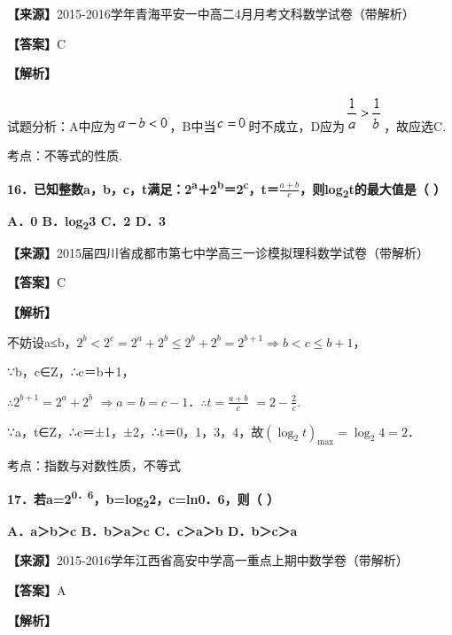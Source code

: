 \documentclass[
]{article}
\begin{document}
\textbf{【来源】}2015-2016学年青海平安一中高二4月月考文科数学试卷（带解析）

\textbf{【答案】}C

\textbf{【解析】}

试题分析：A中应为\includegraphics[width=0.63551in,height=0.19794in]{Fig//media/image165.png}，B中当\includegraphics[width=0.38547in,height=0.19794in]{Fig//media/image166.png}时不成立，D应为\includegraphics[width=0.4584in,height=0.42714in]{Fig//media/image167.png}，故应选C.

考点：不等式的性质.

\textbf{16．已知整数a，b，c，t满足：2\textsuperscript{a}＋2\textsuperscript{b}＝2\textsuperscript{c}，t＝}\(\frac{a + b}{c}\)\textbf{，则log\textsubscript{2}t的最大值是（
）}

\textbf{A．0 B．log\textsubscript{2}3 C．2 D．3}

\textbf{【来源】}2015届四川省成都市第七中学高三一诊模拟理科数学试卷（带解析）

\textbf{【答案】}C

\textbf{【解析】}

不妨设a≤b，\(2^{b} < 2^{c} = 2^{a} + 2^{b} \leq 2^{b} + 2^{b} = 2^{b + 1} \Rightarrow b < c \leq b + 1\)，

∵b，c∈Z，∴c＝b＋1，

\(\therefore 2^{b + 1} = 2^{a} + 2^{b}\)
\(\Rightarrow a = b = c - 1\)．\(\therefore t = \frac{a + b}{c}\)
\(= 2 - \frac{2}{c}\).

∵a，t∈Z，∴c＝±1，±2，∴t＝0，1，3，4，故\({(\log_{2}t)}_{\max} = \log_{2}4 = 2\)．

考点：指数与对数性质，不等式

\textbf{17．若a=2\textsuperscript{0．6}，b=log\textsubscript{2}2，c=ln0．6，则（
）}

\textbf{A．a＞b＞c B．b＞a＞c C．c＞a＞b D．b＞c＞a}

\textbf{【来源】}2015-2016学年江西省高安中学高一重点上期中数学卷（带解析）

\textbf{【答案】}A

\textbf{【解析】}
\end{document}

